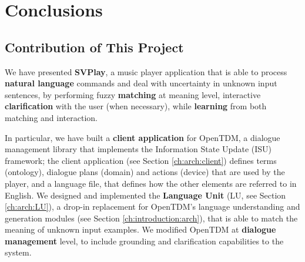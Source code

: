 
\chapter{Conclusions} %

\label{ch:conclusions} %


\section{Contribution of This Project}
We have presented \textbf{SVPlay}, a music player application that is able to process \textbf{natural language} commands and deal with uncertainty in unknown input sentences, by performing fuzzy \textbf{matching} at meaning level, interactive \textbf{clarification} with the user (when necessary), while \textbf{learning} from both matching and interaction.

In particular, we have built a \textbf{client application} for OpenTDM, a dialogue management library that implements the Information State Update (ISU) framework; the client application (see Section \ref{ch:arch:client}) defines terms (ontology), dialogue plans (domain) and actions (device) that are used by the player, and a language file, that defines how the other elements are referred to in English. We designed and implemented the \textbf{Language Unit} (LU, see Section \ref{ch:arch:LU}), a drop-in replacement for OpenTDM's language understanding and generation modules (see Section \ref{ch:introduction:arch}), that is able to match the meaning of unknown input examples. We modified OpenTDM at \textbf{dialogue management} level, to include grounding and clarification capabilities to the system.

